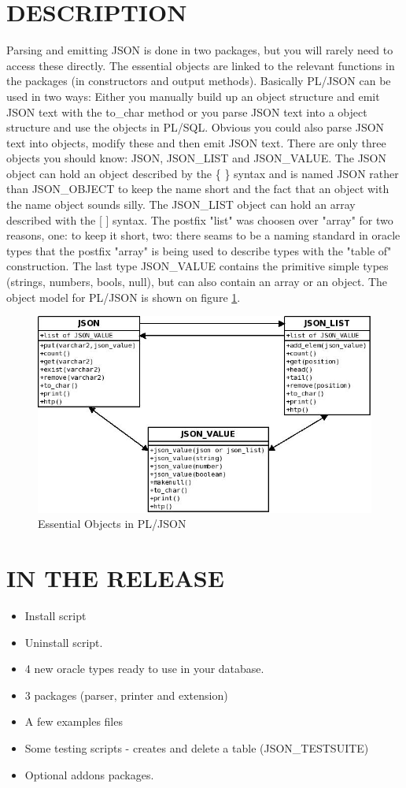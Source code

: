 \documentclass[11pt,a4paper]{article}
\begin{document}
\section{DESCRIPTION}
Parsing and emitting JSON is done in two packages, but you will rarely need to access these directly. The essential objects are linked to the relevant functions in the packages (in constructors and output methods). Basically PL/JSON can be used in two ways: Either you manually build up an object structure and emit JSON text with the to\_char method or you parse JSON text into a object structure and use the objects in PL/SQL. Obvious you could also parse JSON text into objects, modify these and then emit JSON text. There are only three objects you should know: JSON, JSON\_LIST and JSON\_VALUE. The JSON object can hold an object described by the \{ \} syntax and is named JSON rather than JSON\_OBJECT to keep the name short and the fact that an object with the name object sounds silly. The JSON\_LIST object can hold an array described with the [ ] syntax. The postfix "list" was choosen over "array" for two reasons, one: to keep it short, two: there seams to be a naming standard in oracle types that the postfix "array" is being used to describe types with the "table of" construction. The last type JSON\_VALUE contains the primitive simple types (strings, numbers, bools, null), but can also contain an array or an object. The object model for PL/JSON is shown on figure \ref{howjsonwork}.
\begin{figure}[!h]
  \begin{center}
    \includegraphics[width=0.8\linewidth]{visual.jpg}
  \end{center} 
  \caption{Essential Objects in PL/JSON}
  \label{howjsonwork}
\end{figure}
\newpage
\section{IN THE RELEASE}
\begin{itemize}
\item Install script
\item Uninstall script.
\item 4 new oracle types ready to use in your database.
\item 3 packages (parser, printer and extension)
\item A few examples files
\item Some testing scripts - creates and delete a table (JSON\_TESTSUITE)
\item Optional addons packages.
\end{itemize}
\end{document}
